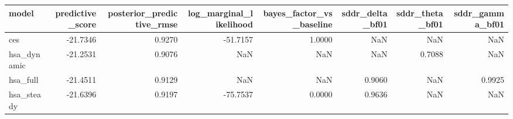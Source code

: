 \begin{tabular}{lrrrrrrr}
\toprule
model & predictive\_score & posterior\_predictive\_rmse & log\_marginal\_likelihood & bayes\_factor\_vs\_baseline & sddr\_delta\_bf01 & sddr\_theta\_bf01 & sddr\_gamma\_bf01 \\
\midrule
ces & -21.7346 & 0.9270 & -51.7157 & 1.0000 & NaN & NaN & NaN \\
hsa\_dynamic & -21.2531 & 0.9076 & NaN & NaN & NaN & 0.7088 & NaN \\
hsa\_full & -21.4511 & 0.9129 & NaN & NaN & 0.9060 & NaN & 0.9925 \\
hsa\_steady & -21.6396 & 0.9197 & -75.7537 & 0.0000 & 0.9636 & NaN & NaN \\
\bottomrule
\end{tabular}

